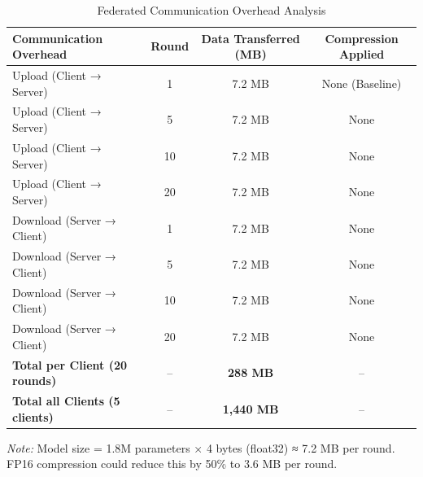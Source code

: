 
\begin{table}[htbp]
\centering
\small
\caption{Federated Communication Overhead Analysis}
\label{tab:communication_overhead}
\begin{tabular}{lccc}
\toprule
\textbf{Communication Overhead} & \textbf{Round} & \textbf{Data Transferred (MB)} & \textbf{Compression Applied} \\
\midrule
Upload (Client → Server) & 1 & 7.2 MB & None (Baseline) \\
Upload (Client → Server) & 5 & 7.2 MB & None \\
Upload (Client → Server) & 10 & 7.2 MB & None \\
Upload (Client → Server) & 20 & 7.2 MB & None \\
\midrule
Download (Server → Client) & 1 & 7.2 MB & None \\
Download (Server → Client) & 5 & 7.2 MB & None \\
Download (Server → Client) & 10 & 7.2 MB & None \\
Download (Server → Client) & 20 & 7.2 MB & None \\
\midrule
\textbf{Total per Client (20 rounds)} & -- & \textbf{288 MB} & -- \\
\textbf{Total all Clients (5 clients)} & -- & \textbf{1,440 MB} & -- \\
\bottomrule
\end{tabular}
\end{table}

\vspace{0.5em}
\textit{Note:} Model size = 1.8M parameters × 4 bytes (float32) ≈ 7.2 MB per round. FP16 compression could reduce this by 50\% to 3.6 MB per round.


